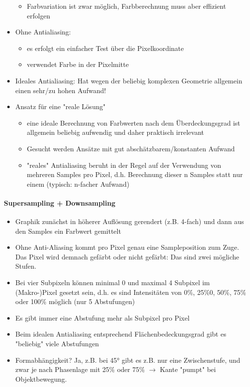 \documentclass[10pt,landscape]{article}
\begin{document}
\begin{multicols}{3}
\begin{itemize}
\begin{itemize}
          \item Farbvariation ist zwar möglich, Farbberechnung muss aber effizient erfolgen
        \end{itemize}
  \item Ohne Antialiasing:
        \begin{itemize}
          \item es erfolgt ein einfacher Test über die Pixelkoordinate
          \item verwendet Farbe in der Pixelmitte
        \end{itemize}
  \item Ideales Antialiasing: Hat wegen der beliebig komplexen Geometrie allgemein einen sehr/zu hohen Aufwand!
  \item Ansatz für eine "reale Lösung"
        \begin{itemize}
          \item eine ideale Berechnung von Farbwerten nach dem Überdeckungsgrad ist allgemein beliebig aufwendig und daher praktisch irrelevant
          \item Gesucht werden Ansätze mit gut abschätzbarem/konstanten Aufwand
          \item "reales" Antialiasing beruht in der Regel auf der Verwendung von mehreren Samples pro Pixel, d.h. Berechnung dieser n Samples statt nur einem (typisch: n-facher Aufwand)
        \end{itemize}
\end{itemize}

\paragraph{Supersampling + Downsampling}
\begin{itemize}
  \item Graphik zunächst in höherer Auflösung gerendert (z.B. 4-fach) und dann aus den Samples ein Farbwert gemittelt
  \item Ohne Anti-Aliasing kommt pro Pixel genau eine Sampleposition zum Zuge. Das Pixel wird demnach gefärbt oder nicht gefärbt: Das sind zwei mögliche Stufen.
  \item Bei vier Subpixeln können minimal 0 und maximal 4 Subpixel im (Makro-)Pixel gesetzt sein, d.h. es sind Intensitäten von 0\%, 25\%0, 50\%, 75\% oder 100\% möglich (nur 5 Abstufungen)
  \item Es gibt immer eine Abstufung mehr als Subpixel pro Pixel
  \item Beim idealen Antialiasing entsprechend Flächenbedeckungsgrad gibt es "beliebig" viele Abstufungen
  \item Formabhängigkeit? Ja, z.B. bei 45° gibt es z.B. nur eine Zwischenstufe, und zwar je nach Phasenlage mit 25\% oder 75\% $\rightarrow$ Kante "pumpt" bei Objektbewegung.
\end{itemize}

\end{multicols}
\end{document}
